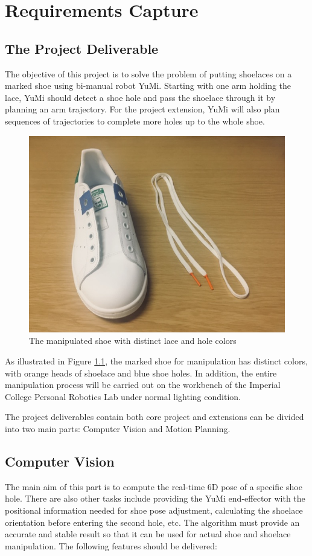 \chapter{Requirements Capture}

\section{The Project Deliverable}
The objective of this project is to solve the problem of putting shoelaces on a marked shoe using bi-manual robot YuMi. Starting with one arm holding the lace, YuMi should detect a shoe hole and pass the shoelace through it by planning an arm trajectory. For the project extension, YuMi will also plan sequences of trajectories to complete more holes up to the whole shoe.

\begin{figure}[H]
\centering
\includegraphics[width = 0.5\columnwidth]{RequirementsCap/shoe.jpg}
\caption{The manipulated shoe with distinct lace and hole colors}
\label{shoe}
\end{figure}

As illustrated in Figure \ref{shoe}, the marked shoe for manipulation has distinct colors, with orange heads of shoelace and blue shoe holes. In addition, the entire manipulation process will be carried out on the workbench of the Imperial College Personal Robotics Lab under normal lighting condition.

The project deliverables contain both core project and extensions can be divided into two main parts: Computer Vision and Motion Planning.

\section{Computer Vision}
The main aim of this part is to compute the real-time 6D pose of a specific shoe hole. There are also other tasks include providing the YuMi end-effector with the positional information needed for shoe pose adjustment, calculating the shoelace orientation before entering the second hole, etc. The algorithm must provide an accurate and stable result so that it can be used for actual shoe and shoelace manipulation. The following features should be delivered:

